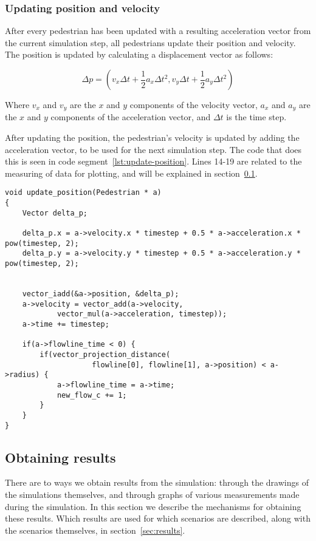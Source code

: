 \subsubsection{Updating position and velocity}
After every pedestrian has been updated with a resulting acceleration vector from 
the current simulation step, all pedestrians update their position and velocity.  
The position is updated by calculating a displacement vector as follows:

\begin{equation}
    \Delta p = (v_x \Delta t + \frac{1}{2}a_x \Delta t^2, v_y \Delta t + 
    \frac{1}{2}a_y \Delta t^2)
\end{equation}

Where $v_x$ and $v_y$ are the $x$ and $y$ components of the velocity vector, 
$a_x$ and $a_y$ are the $x$ and $y$ components of the acceleration vector, and 
$\Delta t$ is the time step.

After updating the position, the pedestrian's velocity is updated by adding the 
acceleration vector, to be used for the next simulation step. The code that 
does this is seen in code segment~\ref{lst:update-position}. Lines 14-19 are 
related to the measuring of data for plotting, and will be explained in 
section~\ref{sec:measurement}.

\begin{lstlisting}[caption={Updating the pedestrian 
    position.},label=lst:update-position]
void update_position(Pedestrian * a)
{
    Vector delta_p;

    delta_p.x = a->velocity.x * timestep + 0.5 * a->acceleration.x * pow(timestep, 2);
    delta_p.y = a->velocity.y * timestep + 0.5 * a->acceleration.y * pow(timestep, 2);


    vector_iadd(&a->position, &delta_p);
	a->velocity = vector_add(a->velocity,
			vector_mul(a->acceleration, timestep));
    a->time += timestep;

	if(a->flowline_time < 0) {
        if(vector_projection_distance(
					flowline[0], flowline[1], a->position) < a->radius) {
			a->flowline_time = a->time;
			new_flow_c += 1;
		}
	}
}
\end{lstlisting}

\subsection{Obtaining results}
\label{sec:measurement}
There are to ways we obtain results from the simulation: through the drawings 
of the simulations themselves, and through graphs of various measurements made 
during the simulation. In this section we describe the mechanisms for 
obtaining these results. Which results are used for which scenarios are 
described, along with the scenarios themselves, in section~\ref{sec:results}.

